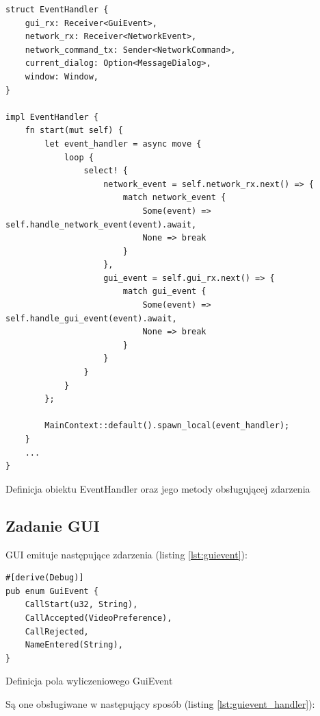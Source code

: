\begin{listing}[H]
    \begin{verbatim}
struct EventHandler {
    gui_rx: Receiver<GuiEvent>,
    network_rx: Receiver<NetworkEvent>,
    network_command_tx: Sender<NetworkCommand>,
    current_dialog: Option<MessageDialog>,
    window: Window,
}

impl EventHandler {
    fn start(mut self) {
        let event_handler = async move {
            loop {
                select! {
                    network_event = self.network_rx.next() => {
                        match network_event {
                            Some(event) => self.handle_network_event(event).await,
                            None => break
                        }
                    },
                    gui_event = self.gui_rx.next() => {
                        match gui_event {
                            Some(event) => self.handle_gui_event(event).await,
                            None => break
                        }
                    }
                }
            }
        };

        MainContext::default().spawn_local(event_handler);
    }
    ...
}
\end{verbatim}
    \caption{Definicja obiektu EventHandler oraz jego metody obsługującej zdarzenia}
    \label{lst:eventhandler}
\end{listing}

\subsection{Zadanie GUI}

GUI emituje następujące zdarzenia (listing \ref{lst:guievent}):

\begin{listing}[H]
    \begin{verbatim}
#[derive(Debug)]
pub enum GuiEvent {
    CallStart(u32, String),
    CallAccepted(VideoPreference),
    CallRejected,
    NameEntered(String),
}
\end{verbatim}
    \caption{Definicja pola wyliczeniowego GuiEvent}
    \label{lst:guievent}
\end{listing}

Są one obsługiwane w następujący sposób (listing \ref{lst:guievent_handler}):

